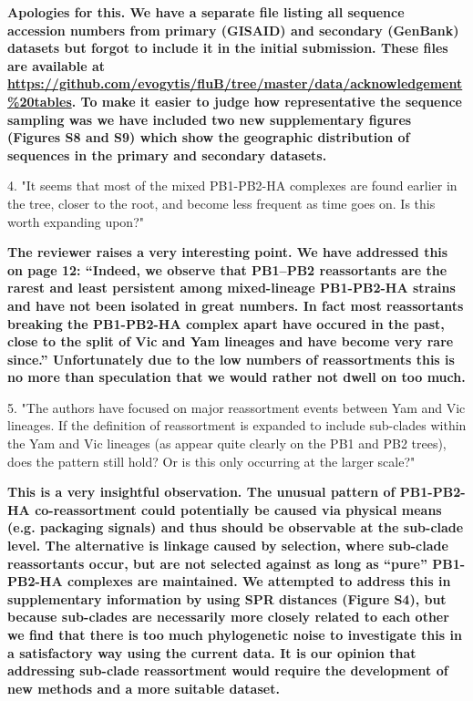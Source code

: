 \documentclass[11pt,oneside,letterpaper]{article}
\begin{document}
\textbf{Apologies for this. We have a separate file listing all sequence accession numbers from primary (GISAID) and secondary (GenBank) datasets but forgot to include it in the initial submission.
These files are available at \url{https://github.com/evogytis/fluB/tree/master/data/acknowledgement\%20tables}.
To make it easier to judge how representative the sequence sampling was we have included two new supplementary figures (Figures S8 and S9) which show the geographic distribution of sequences in the primary and secondary datasets.}

4. "It seems that most of the mixed PB1-PB2-HA complexes are found earlier in the tree, closer to the root, and become less frequent as time goes on.  Is this worth expanding upon?"

\textbf{The reviewer raises a very interesting point. We have addressed this on page 12: 
``Indeed, we observe that PB1--PB2 reassortants are the rarest and least persistent among mixed-lineage PB1-PB2-HA strains and have not been isolated in great numbers.
In fact most reassortants breaking the PB1-PB2-HA complex apart have occured in the past, close to the split of Vic and Yam lineages and have become very rare since.''
Unfortunately due to the low numbers of reassortments this is no more than speculation that we would rather not dwell on too much.}

5. "The authors have focused on major reassortment events between Yam and Vic lineages.  
If the definition of reassortment is expanded to include sub-clades within the Yam and Vic lineages (as appear quite clearly on the PB1 and PB2 trees), does the pattern still hold?  
Or is this only occurring at the larger scale?"

\textbf{This is a very insightful observation. The unusual pattern of PB1-PB2-HA co-reassortment could potentially be caused via physical means (e.g. packaging signals) and thus should be observable at the sub-clade level.
The alternative is linkage caused by selection, where sub-clade reassortants occur, but are not selected against as long as ``pure'' PB1-PB2-HA complexes are maintained.
We attempted to address this in supplementary information by using SPR distances (Figure S4), but because sub-clades are necessarily more closely related to each other we find that there is too much phylogenetic noise to investigate this in a satisfactory way using the current data.
It is our opinion that addressing sub-clade reassortment would require the development of new methods and a more suitable dataset.}
\end{document}
